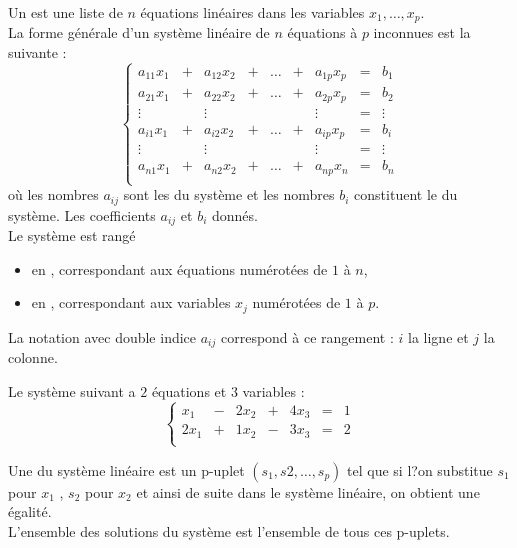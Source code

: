 \documentclass[a4paper]{book}
\begin{document}
\begin{Definition}
Un  est une liste de $n$ équations linéaires dans les variables  $x_1,\dots,x_p$.\\
La forme générale d'un système linéaire de $n$ équations à $p$ inconnues est la suivante :
$$\left\{{\begin{matrix}
a_{11}x_{1}&+&a_{12}x_{2}&+&\dots &+&a_{1p}x_{p}&=&b_{1}\\
a_{21}x_{1}&+&a_{22}x_{2}&+&\dots &+&a_{2p}x_{p}&=&b_{2}\\
\vdots&&\vdots&& &&\vdots&=&\vdots \\
a_{i1}x_{1}&+&a_{i2}x_{2}&+&\dots &+&a_{ip}x_{p}&=&b_{i}\\
\vdots&&\vdots&& &&\vdots&=&\vdots \\
a_{n1}x_{1}&+&a_{n2}x_{2}&+&\dots &+&a_{np}x_{n}&=&b_{n}\\
\end{matrix}}\right. $$
où  les nombres $a_{ij}$ sont les  du système et les nombres $b_i$ constituent le  du système. Les coefficients $a_{ij}$ et $b_i$ donnés.\\
Le système est rangé 
\begin{itemize}
\item en , correspondant aux équations numérotées de $1$ à
$n$, 
\item en ,  correspondant aux variables $x_j$
numérotées de $1$ à
$p$.
\end{itemize}
 La notation avec double indice $a_{i j}$ correspond à ce rangement : $i$ la ligne et  $j$ la colonne.
\end{Definition}
\begin{Exemple}
Le système suivant a $2$ équations et $3$ variables :
$$\left\{{\begin{matrix}
x_{1}&-&2x_{2}&+&4x_{3}&=&1\\
2x_{1}&+&1x_{2}&-&3x_{3}&=&2\\
\end{matrix}}\right. $$
\end{Exemple}
\begin{Definition}[Solution]
Une  du système linéaire est un p-uplet $(s_1,s2,\dots,s_p)$ tel que si l?on
substitue $s_1$ pour $x_1$
, $s_2$ pour $x_2$ et ainsi de suite  dans le système linéaire, on obtient une égalité.\\
 L'ensemble des solutions du système est l'ensemble de tous ces p-uplets.
\end{Definition}
\end{document}

